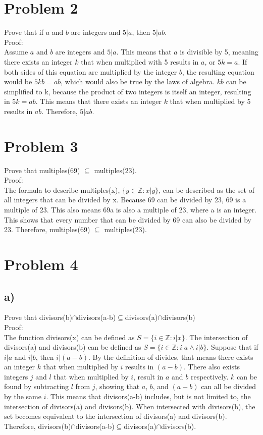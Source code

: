 \documentclass{article}
\begin{document}
\section*{Problem 2}
Prove that if $a$ and $b$ are integers and $5|a$, then $5|ab$.\\
Proof:\\
Assume $a$ and $b$ are integers and $5|a$. This means that $a$ is divisible by 5, meaning there exists an integer $k$ that when multiplied with 5 results in $a$, or $5k=a$. If both sides of this equation are multiplied by the integer $b$, the resulting equation would be $5kb=ab$, which would also be true by the laws of algebra. $kb$ can be simplified to k, because the product of two integers is itself an integer, resulting in $5k=ab$. This means that there exists an integer $k$ that when multiplied by 5 results in $ab$.  Therefore, $5|ab$.
\section*{Problem 3}
Prove that multiples(69) $\subseteq$ multiples(23).\\
Proof:\\
The formula to describe multiples(x), $\{y \in \mathbb{Z}:x|y\}$, can be described as the set of all integers that can be divided by x. Because 69 can be divided by 23, 69 is a multiple of 23. This also means 69a is also a multiple of 23, where a is an integer. This shows that every number that can be divided by 69 can also be divided by 23. Therefore, multiples(69) $\subseteq$ multiples(23).
\clearpage
\section*{Problem 4}
\subsection*{a)}
Prove that divisors(b)$\cap$divisors(a-b)$\subseteq$divisors(a)$\cap$divisors(b)\\
Proof:\\
The function divisors(x) can be defined as $S=\{i \in \mathbb{Z}:i|x\}$. The intersection of divisors(a) and divisors(b) can be defined as $S=\{i\in \mathbb{Z}:i|a\land i|b\}$. Suppose that if $i|a$ and $i|b$, then $i|(a-b)$. By the definition of divides, that means there exists an integer $k$ that when multiplied by $i$ results in $(a-b)$. There also exists integers $j$ and $l$ that when multiplied by $i$, result in $a$ and $b$ respectively. $k$ can be found by subtracting $l$ from $j$, showing that $a$, $b$, and $(a-b)$ can all be divided by the same $i$. This means that divisors(a-b) includes, but is not limited to, the intersection of divisors(a) and divisors(b). When intersected with divisors(b), the set becomes equivalent to the intersection of divisors(a) and divisors(b). Therefore, divisors(b)$\cap$divisors(a-b)$\subseteq$divisors(a)$\cap$divisors(b).
\end{document}

